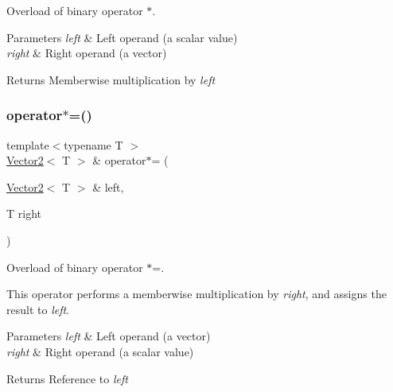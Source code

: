 Overload of binary operator $\ast$. 


\begin{DoxyParams}{Parameters}
{\em left} & Left operand (a scalar value) \\
\hline
{\em right} & Right operand (a vector)\\
\hline
\end{DoxyParams}
\begin{DoxyReturn}{Returns}
Memberwise multiplication by {\itshape left} 
\end{DoxyReturn}
\mbox{\label{classsf_1_1_vector2_abea24cb28c0d6e2957e259ba4e65d70e}} 
\subsubsection{\texorpdfstring{operator$\ast$=()}{operator*=()}}
{\footnotesize\ttfamily template$<$typename T $>$ \\
\hyperlink{classsf_1_1_vector2}{Vector2}$<$ T $>$ \& operator$\ast$= (\begin{DoxyParamCaption}\item[{\hyperlink{classsf_1_1_vector2}{Vector2}$<$ T $>$ \&}]{left,  }\item[{T}]{right }\end{DoxyParamCaption})\hspace{0.3cm}{\ttfamily [related]}}



Overload of binary operator $\ast$=. 

This operator performs a memberwise multiplication by {\itshape right}, and assigns the result to {\itshape left}.


\begin{DoxyParams}{Parameters}
{\em left} & Left operand (a vector) \\
\hline
{\em right} & Right operand (a scalar value)\\
\hline
\end{DoxyParams}
\begin{DoxyReturn}{Returns}
Reference to {\itshape left} 
\end{DoxyReturn}
\mbox{\label{classsf_1_1_vector2_a72421239823c38a6b780c86a710ead07}} 
